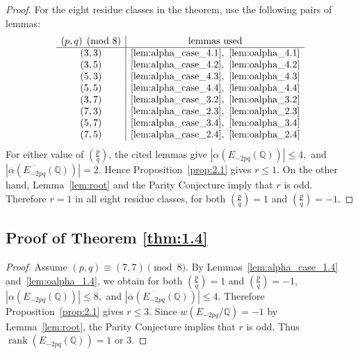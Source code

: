 \documentclass[12pt]{amsart}
\newcommand{\bbQ}{\mathbb{Q}}
\newcommand{\legendre}[2]{\genfrac{(}{)}{}{}{#1}{#2}}
\DeclareMathOperator{\rank}{rank}
\numberwithin{equation}{section}
\theoremstyle{definition}
\newcommand{\bidisha}[1]{\textcolor{blue}{\textbf{Bidisha:} #1}}
\begin{document}
\begin{proof}
For the eight residue classes in the theorem, use the following pairs of lemmas:
\[
\begin{array}{c|c}
(p,q)\pmod8 & \text{lemmas used}\\
\hline
(3,3) & \ref{lem:alpha_case_4.1},\ \ref{lem:oalpha_4.1}\\
(3,5) & \ref{lem:alpha_case_4.2},\ \ref{lem:oalpha_4.2}\\
(5,3) & \ref{lem:alpha_case_4.3},\ \ref{lem:oalpha_4.3}\\
(5,5) & \ref{lem:alpha_case_4.4},\ \ref{lem:oalpha_4.4}\\
(3,7) & \ref{lem:alpha_case_3.2},\ \ref{lem:oalpha_3.2}\\
(7,3) & \ref{lem:alpha_case_2.3},\ \ref{lem:oalpha_2.3}\\
(5,7) & \ref{lem:alpha_case_3.4},\ \ref{lem:oalpha_3.4}\\
(7,5) & \ref{lem:alpha_case_2.4},\ \ref{lem:oalpha_2.4}
\end{array}
\]
For either value of $\legendre{p}{q}$, the cited lemmas give
$\displaystyle|\alpha(E_{-2pq}(\bbQ))|\leq4,$ and $
\displaystyle
\left|\overline{\alpha}\left(\overline{E_{-2pq}}(\bbQ)\right)\right|=2.
$
Hence Proposition~\ref{prop:2.1} gives $r\leq1$. On the other hand,
Lemma~\ref{lem:root} and the Parity Conjecture imply that $r$ is odd.
Therefore $r=1$ in all eight residue classes, for both
$\legendre{p}{q}=1$ and $\legendre{p}{q}=-1$.
\end{proof}

\subsection*{Proof of Theorem \ref{thm:1.4}}

\begin{proof}
Assume $(p,q)\equiv(7,7)\pmod8$. By Lemmas~\ref{lem:alpha_case_1.4}
and~\ref{lem:oalpha_1.4}, we obtain for both $\legendre{p}{q}=1$ and $\legendre{p}{q}=-1$, $ \displaystyle |\alpha(E_{-2pq}(\bbQ))|\leq8,$ and $ \displaystyle
\left|\overline{\alpha}\left(\overline{E_{-2pq}}(\bbQ)\right)\right|\leq4.
$
Therefore Proposition~\ref{prop:2.1} gives $r\leq3$. Since
$w(E_{-2pq}/\bbQ)=-1$ by Lemma~\ref{lem:root}, the Parity Conjecture implies
that $r$ is odd. Thus $\rank(E_{-2pq}(\bbQ))=1\text{ or }3$.

\end{proof}
\end{document}
